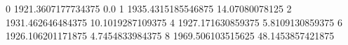 0 1921.3607177734375 0.0
1 1935.4315185546875 14.07080078125
2 1931.462646484375 10.1019287109375
4 1927.171630859375 5.8109130859375
6 1926.106201171875 4.7454833984375
8 1969.506103515625 48.1453857421875
